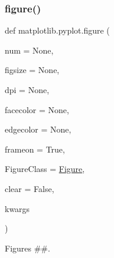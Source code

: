 \mbox{\label{namespacematplotlib_1_1pyplot_a78e7f62ac1eee7f67da0f01e0461a18a}} 
\subsubsection{\texorpdfstring{figure()}{figure()}}
{\footnotesize\ttfamily def matplotlib.\+pyplot.\+figure (\begin{DoxyParamCaption}\item[{}]{num = {\ttfamily None},  }\item[{}]{figsize = {\ttfamily None},  }\item[{}]{dpi = {\ttfamily None},  }\item[{}]{facecolor = {\ttfamily None},  }\item[{}]{edgecolor = {\ttfamily None},  }\item[{}]{frameon = {\ttfamily True},  }\item[{}]{Figure\+Class = {\ttfamily \hyperlink{classmatplotlib_1_1figure_1_1Figure}{Figure}},  }\item[{}]{clear = {\ttfamily False},  }\item[{}]{kwargs }\end{DoxyParamCaption})}



Figures \#\#. 

